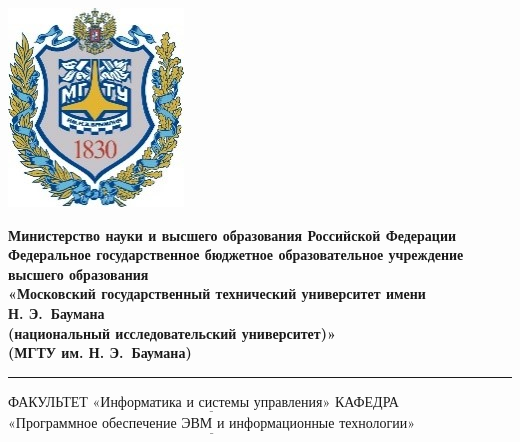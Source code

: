 \begin{titlepage}
	\fontsize{12pt}{12pt}\selectfont
	\noindent \begin{minipage}{0.15\textwidth}
		\includegraphics[width=\linewidth]{images/b_logo.jpg}
	\end{minipage}
	\noindent\begin{minipage}{0.9\textwidth}\centering
		\textbf{Министерство науки и высшего образования Российской Федерации}\\
		\textbf{Федеральное государственное бюджетное образовательное учреждение высшего образования}\\
		\textbf{«Московский государственный технический университет имени \\ Н. Э.~Баумана}\\
		\textbf{(национальный исследовательский университет)»}\\
		\textbf{(МГТУ им. Н. Э.~Баумана)}
	\end{minipage}
	
	\noindent\rule{18cm}{3pt}
	\newline\newline
	\noindent ФАКУЛЬТЕТ $\underline{\text{«Информатика и системы управления»}}$ \newline
	\noindent КАФЕДРА $\underline{\text{«Программное обеспечение ЭВМ и информационные технологии»}}$\newline\newline\newline\newline\newline\newline\newline\newline
	

\end{titlepage}

